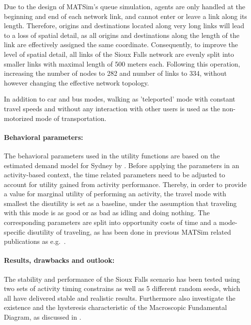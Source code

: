 Due to the design of MATSim’s queue simulation, agents are only handled at the beginning and end of each network link, and cannot enter or leave a link along its length. Therefore, origins and destinations located along very long links will lead to a loss of spatial detail, as all origins and destinations along the length of the link are effectively assigned the same coordinate. Consequently, to improve the level of spatial detail, all links of the Sioux Falls network are evenly split into smaller links with maximal length of 500 meters each. Following this operation, increasing the number of nodes to 282 and number of links to 334, without however changing the effective network topology.

In addition to car and bus modes, walking as 'teleported' mode with constant travel speeds and without any interaction with other users is used as the non-motorized mode of transportation. 

\paragraph{Behavioral parameters:}

The behavioral parameters used in the utility functions are based on the estimated demand model for Sydney by \citet[][]{TirachiniHensherRose_TransResB_2014}. Before applying the parameters in an activity-based context, the time related parameters need to be adjusted to account for utility gained from activity performance. Thereby, in order to provide a value for marginal utility of performing an activity, the travel mode with smallest the disutility is set as a baseline, under the assumption that traveling with this mode is as good or as bad as idling and doing nothing. The corresponding parameters are split into opportunity costs of time and a mode-specific disutility of traveling, as has been done in previous MATSim related publications as e.g.\ \citet[][]{KickhoeferEtAl_Transportation_2011}. 

\paragraph{Results, drawbacks and outlook:}

The stability and performance of the Sioux Falls scenario has been tested using two sets of activity timing constrains as well as 5 different random seeds, which all have delivered stable and realistic results. Furthermore \citet[][]{ChakirovFourie_TechRep_FCL_2014} also investigate the existence and the hysteresis characteristic of the Macroscopic Fundamental Diagram, as discussed in \citet[][]{GeroliminisDaganzo_TRB_2007, GeroliminisDaganzo_TransResB_2008, GeroliminisSun_TransResA_2011}. 

